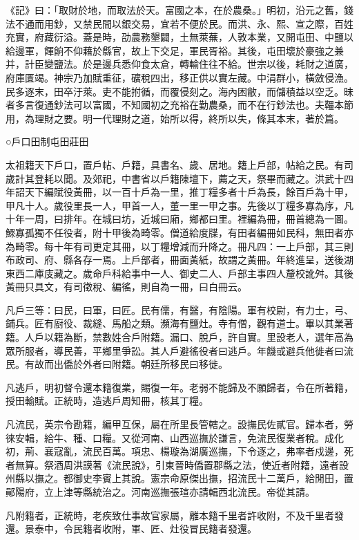 

《記》曰：「取財於地，而取法於天。富國之本，在於農桑。」明初，沿元之舊，錢法不通而用鈔，又禁民間以銀交易，宜若不便於民。而洪、永、熙、宣之際，百姓充實，府藏衍溢。蓋是時，劭農務墾闢，土無萊蕪，人敦本業，又開屯田、中鹽以給邊軍，餫餉不仰藉於縣官，故上下交足，軍民胥裕。其後，屯田壞於豪強之兼并，計臣變鹽法。於是邊兵悉仰食太倉，轉輸住往不給。世宗以後，耗財之道廣，府庫匱竭。神宗乃加賦重征，礦稅四出，移正供以實左藏。中涓群小，橫斂侵漁。民多逐末，田卒汙萊。吏不能拊循，而覆侵刻之。海內困敝，而儲積益以空乏。昧者多言復通鈔法可以富國，不知國初之充裕在勤農桑，而不在行鈔法也。夫韁本節用，為理財之要。明一代理財之道，始所以得，終所以失，條其本末，著於篇。

○戶口田制屯田莊田

太祖籍天下戶口，置戶帖、戶籍，具書名、歲、居地。籍上戶部，帖給之民。有司歲計其登耗以聞。及郊祀，中書省以戶籍陳壇下，薦之天，祭畢而藏之。洪武十四年詔天下編賦役黃冊，以一百十戶為一里，推丁糧多者十戶為長，餘百戶為十甲，甲凡十人。歲役里長一人，甲首一人，董一里一甲之事。先後以丁糧多寡為序，凡十年一周，曰排年。在城曰坊，近城曰廂，鄉都曰里。裡編為冊，冊首總為一圖。鰥寡孤獨不任役者，附十甲後為畸零。僧道給度牒，有田者編冊如民科，無田者亦為畸零。每十年有司更定其冊，以丁糧增減而升降之。冊凡四：一上戶部，其三則布政司、府、縣各存一焉。上戶部者，冊面黃紙，故謂之黃冊。年終進呈，送後湖東西二庫庋藏之。歲命戶科給事中一人、御史二人、戶部主事四人釐校訛舛。其後黃冊只具文，有司徵稅、編徭，則自為一冊，曰白冊云。

凡戶三等：曰民，曰軍，曰匠。民有儒，有醫，有陰陽。軍有校尉，有力士，弓、鋪兵。匠有廚役、裁縫、馬船之類。瀕海有鹽灶。寺有僧，觀有道士。畢以其業著籍。人戶以籍為斷，禁數姓合戶附籍。漏口、脫戶，許自實。里設老人，選年高為眾所服者，導民善，平鄉里爭訟。其人戶避徭役者曰逃戶。年饑或避兵他徙者曰流民。有故而出僑於外者曰附籍。朝廷所移民曰移徙。

凡逃戶，明初督令還本籍復業，賜復一年。老弱不能歸及不願歸者，令在所著籍，授田輸賦。正統時，造逃戶周知冊，核其丁糧。

凡流民，英宗令勘籍，編甲互保，屬在所里長管轄之。設撫民佐貳官。歸本者，勞徠安輯，給牛、種、口糧。又從河南、山西巡撫於謙言，免流民復業者稅。成化初，荊、襄寇亂，流民百萬。項忠、楊璇為湖廣巡撫，下令逐之，弗率者戍邊，死者無算。祭酒周洪謨著《流民說》，引東晉時僑置郡縣之法，使近者附籍，遠者設州縣以撫之。都御史李賓上其說。憲宗命原傑出撫，招流民十二萬戶，給閒田，置鄖陽府，立上津等縣統治之。河南巡撫張瑄亦請輯西北流民。帝從其請。

凡附籍者，正統時，老疾致仕事故官家屬，離本籍千里者許收附，不及千里者發還。景泰中，令民籍者收附，軍、匠、灶役冒民籍者發還。


